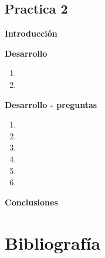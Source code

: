 \documentclass[11pt,letterpaper]{article}
\begin{document}
	
    
    
    \begin{center}
	\section*{\LARGE{Practica 2}}
    \end{center}

    \begin{center}
        \LARGE{\textbf{Introducción}}\\
    \end{center}
    \normalsize
    


    \newpage
    \begin{center}
        \LARGE{\textbf{Desarrollo }}\\
    \end{center}
    \normalsize
    \begin{enumerate}
        \item 
        \item 
    \end{enumerate}
    
    \newpage
    \begin{center}
        \LARGE{\textbf{Desarrollo - preguntas}}\\
    \end{center}
    \normalsize
    \begin{enumerate}
        \item 
        \item 
        \item 
        \item 
        \item 
        \item 
    \end{enumerate}

    \newpage
    \begin{center}
        \LARGE{\textbf{Conclusiones}}\\
    \end{center}
    \normalsize
    

    
\newpage

\Large \section*{Bibliografía}
  
  
\end{document}

